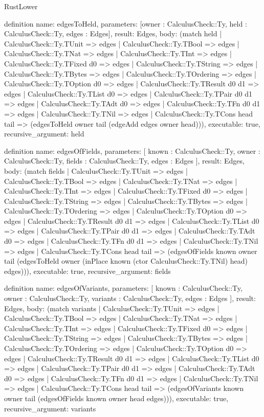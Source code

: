 \begin{lexlean}{RustLower}
\begin{semanticmodule}
definition{
  name: edgesToHeld,
  parameters: [owner : CalculusCheck::Ty, held : CalculusCheck::Ty, edges : Edges],
  result: Edges,
  body: (match held
    | CalculusCheck::Ty.TUnit => edges
    | CalculusCheck::Ty.TBool => edges
    | CalculusCheck::Ty.TNat => edges
    | CalculusCheck::Ty.TInt => edges
    | CalculusCheck::Ty.TFixed d0 => edges
    | CalculusCheck::Ty.TString => edges
    | CalculusCheck::Ty.TBytes => edges
    | CalculusCheck::Ty.TOrdering => edges
    | CalculusCheck::Ty.TOption d0 => edges
    | CalculusCheck::Ty.TResult d0 d1 => edges
    | CalculusCheck::Ty.TList d0 => edges
    | CalculusCheck::Ty.TPair d0 d1 => edges
    | CalculusCheck::Ty.TAdt d0 => edges
    | CalculusCheck::Ty.TFn d0 d1 => edges
    | CalculusCheck::Ty.TNil => edges
    | CalculusCheck::Ty.TCons head tail => (edgesToHeld owner tail (edgeAdd edges owner head))),
  executable: true,
  recursive_argument: held
}

definition{
  name: edgesOfFields,
  parameters: [
    known : CalculusCheck::Ty,
    owner : CalculusCheck::Ty,
    fields : CalculusCheck::Ty,
    edges : Edges
  ],
  result: Edges,
  body: (match fields
    | CalculusCheck::Ty.TUnit => edges
    | CalculusCheck::Ty.TBool => edges
    | CalculusCheck::Ty.TNat => edges
    | CalculusCheck::Ty.TInt => edges
    | CalculusCheck::Ty.TFixed d0 => edges
    | CalculusCheck::Ty.TString => edges
    | CalculusCheck::Ty.TBytes => edges
    | CalculusCheck::Ty.TOrdering => edges
    | CalculusCheck::Ty.TOption d0 => edges
    | CalculusCheck::Ty.TResult d0 d1 => edges
    | CalculusCheck::Ty.TList d0 => edges
    | CalculusCheck::Ty.TPair d0 d1 => edges
    | CalculusCheck::Ty.TAdt d0 => edges
    | CalculusCheck::Ty.TFn d0 d1 => edges
    | CalculusCheck::Ty.TNil => edges
    | CalculusCheck::Ty.TCons head tail => (edgesOfFields known owner tail (edgesToHeld owner (inPlace known (ctor CalculusCheck::Ty.TNil) head) edges))),
  executable: true,
  recursive_argument: fields
}

definition{
  name: edgesOfVariants,
  parameters: [
    known : CalculusCheck::Ty,
    owner : CalculusCheck::Ty,
    variants : CalculusCheck::Ty,
    edges : Edges
  ],
  result: Edges,
  body: (match variants
    | CalculusCheck::Ty.TUnit => edges
    | CalculusCheck::Ty.TBool => edges
    | CalculusCheck::Ty.TNat => edges
    | CalculusCheck::Ty.TInt => edges
    | CalculusCheck::Ty.TFixed d0 => edges
    | CalculusCheck::Ty.TString => edges
    | CalculusCheck::Ty.TBytes => edges
    | CalculusCheck::Ty.TOrdering => edges
    | CalculusCheck::Ty.TOption d0 => edges
    | CalculusCheck::Ty.TResult d0 d1 => edges
    | CalculusCheck::Ty.TList d0 => edges
    | CalculusCheck::Ty.TPair d0 d1 => edges
    | CalculusCheck::Ty.TAdt d0 => edges
    | CalculusCheck::Ty.TFn d0 d1 => edges
    | CalculusCheck::Ty.TNil => edges
    | CalculusCheck::Ty.TCons head tail => (edgesOfVariants known owner tail (edgesOfFields known owner head edges))),
  executable: true,
  recursive_argument: variants
}


\end{semanticmodule}
\end{lexlean}
